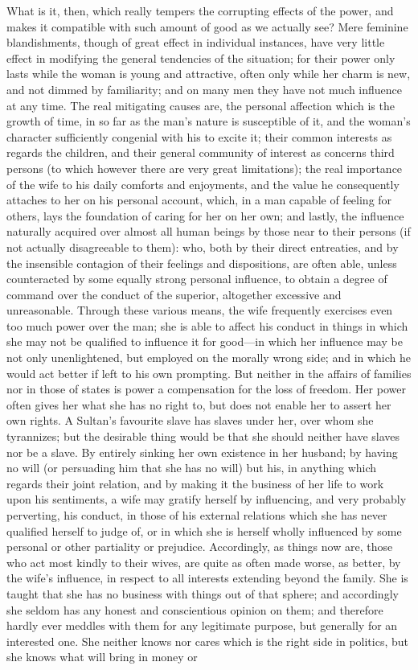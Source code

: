 \documentclass[12pt]{report}
\begin{document}
What is it, then, which really tempers the corrupting effects of the power, and makes it compatible with such amount of good as we actually see? Mere feminine blandishments, though of great effect in individual instances, have very little effect in modifying the general tendencies of the situation; for their power only lasts while the woman is young and attractive, often only while her charm is new, and not dimmed by familiarity; and on many men they have not much influence at any time. The real mitigating causes are, the personal affection which is the growth of time, in so far as the man's nature is susceptible of it, and the woman's character sufficiently congenial with his to excite it; their common interests as regards the children, and their general community of interest as concerns third persons (to which however there are very great limitations); the real importance of the wife to his daily comforts and enjoyments, and the value he consequently attaches to her on his personal account, which, in a man capable of feeling for others, lays the foundation of caring for her on her own; and lastly, the influence naturally acquired over almost all human beings by those near to their persons (if not actually disagreeable to them): who, both by their direct entreaties, and by the insensible contagion of their feelings and dispositions, are often able, unless counteracted by some equally strong personal influence, to obtain a degree of command over the conduct of the superior, altogether excessive and unreasonable. Through these various means, the wife frequently exercises even too much power over the man; she is able to affect his conduct in things in which she may not be qualified to influence it for good—in which her influence may be not only unenlightened, but employed on the morally wrong side; and in which he would act better if left to his own prompting. But neither in the affairs of families nor in those of states is power a compensation for the loss of freedom. Her power often gives her what she has no right to, but does not enable her to assert her own rights. A Sultan's favourite slave has slaves under her, over whom she tyrannizes; but the desirable thing would be that she should neither have slaves nor be a slave. By entirely sinking her own existence in her husband; by having no will (or persuading him that she has no will) but his, in anything which regards their joint relation, and by making it the business of her life to work upon his sentiments, a wife may gratify herself by influencing, and very probably perverting, his conduct, in those of his external relations which she has never qualified herself to judge of, or in which she is herself wholly influenced by some personal or other partiality or prejudice. Accordingly, as things now are, those who act most kindly to their wives, are quite as often made worse, as better, by the wife's influence, in respect to all interests extending beyond the family. She is taught that she has no business with things out of that sphere; and accordingly she seldom has any honest and conscientious opinion on them; and therefore hardly ever meddles with them for any legitimate purpose, but generally for an interested one. She neither knows nor cares which is the right side in politics, but she knows what will bring in money or 
\end{document}
